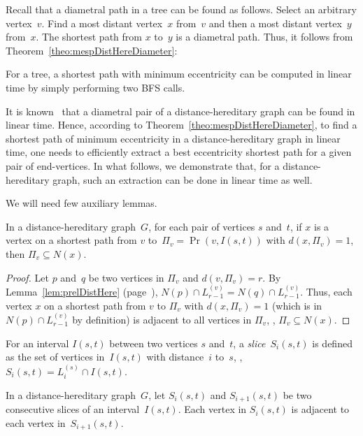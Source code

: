 Recall that a diametral path in a tree can be found as follows.
Select an arbitrary vertex~$v$.
Find a most distant vertex~$x$ from~$v$ and then a most distant vertex~$y$ from~$x$.
The shortest path from $x$ to~$y$ is a diametral path.
Thus, it follows from Theorem~\ref{theo:mespDistHereDiameter}:

\begin{corollary}
    \label{cor:mespTrees}
For a tree, a shortest path with minimum eccentricity can be computed in linear time by simply performing two BFS calls.
\end{corollary}

It is known~\cite{DraganNicola2000} that a diametral pair of a distance-hereditary graph can be found in linear time.
Hence, according to Theorem~\ref{theo:mespDistHereDiameter}, to find a shortest path of minimum eccentricity in a distance-hereditary graph in linear time, one needs to efficiently extract a best eccentricity shortest path for a given pair of end-vertices.
In what follows, we demonstrate that, for a distance-hereditary graph, such an extraction can be done in linear time as well.

We will need few auxiliary lemmas.

\begin{lemma}
    \label{lem:dhgGateVertex}
In a distance-hereditary graph~\( G \), for each pair of vertices \( s \) and~\( t \), if \( x \) is a vertex on a shortest path from \( v \) to~\( \Pi_v = \Pr(v, I(s,t)) \) with \( d(x, \Pi_v) = 1 \), then \( \Pi_v \subseteq N(x) \).
\end{lemma}

\begin{proof}
Let $p$ and~$q$ be two vertices in $\Pi_v$ and $d(v, \Pi_v) = r$.
By Lemma~\ref{lem:prelDistHere} (page~\pageref{lem:prelDistHere}), $N(p) \cap L_{r-1}^{(v)} = N(q) \cap L_{r-1}^{(v)}$.
Thus, each vertex $x$ on a shortest path from $v$ to $\Pi_v$ with $d(x,\Pi_v) = 1$ (which is in $N(p) \cap L_{r-1}^{(v)}$ by definition) is adjacent to all vertices in $\Pi_v$, \ie, $\Pi_v \subseteq N(x)$.
\end{proof}

For an interval $I(s, t)$ between two vertices $s$ and~$t$, a \emph{slice~\( S_i(s, t) \)} is defined as the set of vertices in~$I(s, t)$ with distance~$i$ to~$s$, \ie, $S_i(s, t) = L_i^{(s)} \cap I(s, t)$.

\begin{lemma}
    \label{lem:dhgSliceJoin}
In a distance-hereditary graph~\( G \), let \( S_i(s, t) \) and \( S_{i+1}(s, t) \) be two consecutive slices of an interval~\( I(s, t) \).
Each vertex in \( S_i(s, t) \) is adjacent to each vertex in~\( S_{i+1}(s,t) \).
\end{lemma}


